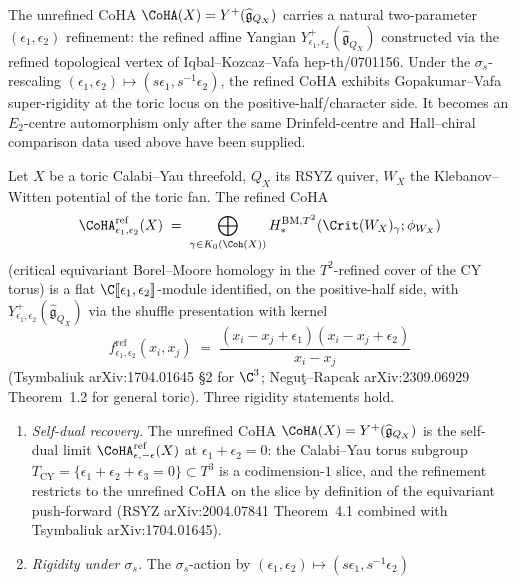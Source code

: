 The unrefined CoHA $\CoHA(X) = Y^{+}(\widehat{\mathfrak{g}}_{Q_X})$
carries a natural two-parameter $(\epsilon_1, \epsilon_2)$
refinement: the refined affine Yangian
$Y^{+}_{\epsilon_1, \epsilon_2}(\widehat{\mathfrak{g}}_{Q_X})$
constructed via the refined topological vertex of
Iqbal--Kozcaz--Vafa \textup{hep-th/0701156}. Under the
$\sigma_s$-rescaling $(\epsilon_1, \epsilon_2) \mapsto (s\epsilon_1,
s^{-1}\epsilon_2)$, the refined CoHA exhibits Gopakumar--Vafa
super-rigidity at the toric locus on the positive-half/character side.
It becomes an $E_2$-centre automorphism only after the same
Drinfeld-centre and Hall--chiral comparison data used above have been
supplied.

\begin{theorem}
\label{thm:refined-coha-super-rigidity-toric}
Let $X$ be a toric Calabi--Yau threefold, $Q_X$ its RSYZ quiver,
$W_X$ the Klebanov--Witten potential of the toric fan. The refined
CoHA
\[
 \CoHA^{\mathrm{ref}}_{\epsilon_1, \epsilon_2}(X)
 \;=\;
 \bigoplus_{\gamma \in K_0(\Coh(X))}
 H^{\mathrm{BM}, T^{2}}_{*}(\Crit(W_X)_\gamma; \phi_{W_X})
\]
(critical equivariant Borel--Moore homology in the $T^{2}$-refined
cover of the CY torus) is a flat $\C[\![\epsilon_1, \epsilon_2]\!]$-module
identified, on the positive-half side, with
$Y^{+}_{\epsilon_1, \epsilon_2}(\widehat{\mathfrak{g}}_{Q_X})$
via the shuffle presentation with kernel
\[
 f^{\mathrm{ref}}_{\epsilon_1, \epsilon_2}(x_i, x_j)
 \;=\;
 \frac{(x_i - x_j + \epsilon_1)(x_i - x_j + \epsilon_2)}{x_i - x_j}
\]
(Tsymbaliuk \textup{arXiv:1704.01645} \S2 for $\C^{3}$;
Negu\c{t}--Rapcak \textup{arXiv:2309.06929} Theorem~1.2 for general
toric). Three rigidity statements hold.
\begin{enumerate}[label=\textup{(\roman*)}]
\item \emph{Self-dual recovery.} The unrefined CoHA
 $\CoHA(X) = Y^{+}(\widehat{\mathfrak{g}}_{Q_X})$ is the
 self-dual limit $\CoHA^{\mathrm{ref}}_{\epsilon, -\epsilon}(X)$ at
 $\epsilon_1 + \epsilon_2 = 0$: the Calabi--Yau torus subgroup
 $T_{\mathrm{CY}} = \{\epsilon_1 + \epsilon_2 + \epsilon_3 = 0\}
 \subset T^{3}$ is a codimension-$1$ slice, and the refinement
 restricts to the unrefined CoHA on the slice by definition of the
 equivariant push-forward (RSYZ \textup{arXiv:2004.07841}
 Theorem~4.1 combined with Tsymbaliuk
 \textup{arXiv:1704.01645}).
\item \emph{Rigidity under $\sigma_s$.} The $\sigma_s$-action by
 $(\epsilon_1, \epsilon_2) \mapsto (s\epsilon_1, s^{-1}\epsilon_2)$

\end{enumerate}
\end{theorem}
